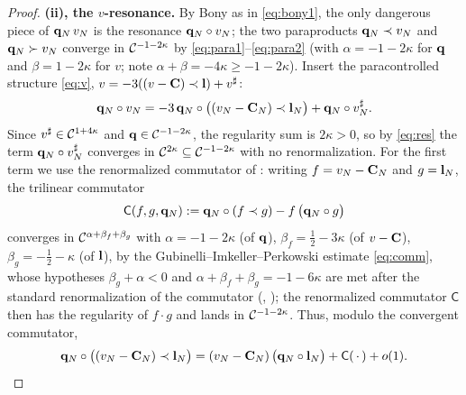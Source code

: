 \begin{proof}
\medskip
\textbf{(ii), the $v$-resonance.} By Bony as in \eqref{eq:bony1}, the only dangerous
piece of $\mathbf{q}_N\,v_N$ is the resonance $\mathbf{q}_N\circ v_N$; the two paraproducts
$\mathbf{q}_N\prec v_N$ and $\mathbf{q}_N\succ v_N$ converge in $\mathcal{C}^{-1-2\kappa}$ by
\eqref{eq:para1}--\eqref{eq:para2} (with $\alpha=-1-2\kappa$ for $\mathbf{q}$ and
$\beta=1-2\kappa$ for $v$; note $\alpha+\beta=-4\kappa\ge -1-2\kappa$). Insert the
paracontrolled structure \eqref{eq:v}, $v=-3((v-\mathbf{C})\prec\mathbf{l})+v^\sharp$:
\begin{equation}\label{eq:vres}
\mathbf{q}_N\circ v_N=-3\,\mathbf{q}_N\circ\bigl((v_N-\mathbf{C}_N)\prec\mathbf{l}_N\bigr)+\mathbf{q}_N\circ v_N^\sharp .
\end{equation}
Since $v^\sharp\in\mathcal{C}^{1+4\kappa}$ and $\mathbf{q}\in\mathcal{C}^{-1-2\kappa}$, the regularity
sum is $2\kappa>0$, so by \eqref{eq:res} the term $\mathbf{q}_N\circ v_N^\sharp$ converges
in $\mathcal{C}^{2\kappa}\subseteq\mathcal{C}^{-1-2\kappa}$ with no renormalization. For the first
term we use the renormalized commutator of \cite{CC18,GIP15}: writing $f=v_N-\mathbf{C}_N$
and $g=\mathbf{l}_N$, the trilinear commutator
\begin{equation}\label{eq:commsplit}
\mathsf C(f,g,\mathbf{q}_N):=\mathbf{q}_N\circ(f\prec g)-f\,\bigl(\mathbf{q}_N\circ g\bigr)
\end{equation}
converges in $\mathcal{C}^{\alpha+\beta_f+\beta_g}$ with $\alpha=-1-2\kappa$ (of $\mathbf{q}$),
$\beta_f=\tfrac12-3\kappa$ (of $v-\mathbf{C}$), $\beta_g=-\tfrac12-\kappa$ (of $\mathbf{l}$),
by the Gubinelli--Imkeller--Perkowski estimate \eqref{eq:comm}, whose hypotheses
$\beta_g+\alpha<0$ and $\alpha+\beta_f+\beta_g=-1-6\kappa$ are met after the standard
renormalization of the commutator (\cite[Lem.~10.4]{GIP15}, \cite{CC18}); the
renormalized commutator $\mathsf C$ then has the regularity of $f\cdot g$ and lands in
$\mathcal{C}^{-1-2\kappa}$. Thus, modulo the convergent commutator,
\begin{equation}\label{eq:vsplit2}
\mathbf{q}_N\circ\bigl((v_N-\mathbf{C}_N)\prec\mathbf{l}_N\bigr)
=(v_N-\mathbf{C}_N)\,\bigl(\mathbf{q}_N\circ\mathbf{l}_N\bigr)+\mathsf C(\,\cdot\,)+o(1).
\end{equation}


\end{proof}

